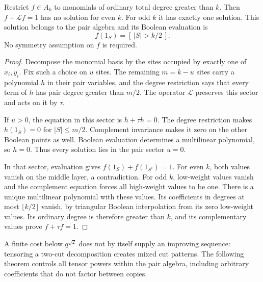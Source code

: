 \begin{proposition}
\label{prop:high-degree-multiplication}
Restrict \(f\in A_k\) to monomials of ordinary total degree greater
than \(k\). Then \(f+\mathcal Lf=1\) has no solution for even \(k\).
For odd \(k\) it has exactly one solution. This solution belongs to
the pair algebra and its Boolean evaluation is
\[
 f(1_S)=[\,|S|>k/2\,].
\]
No symmetry assumption on \(f\) is required.
\end{proposition}
\begin{proof}
Decompose the monomial basis by the sites occupied by exactly one
of \(x_i,y_i\). Fix such a choice on \(u\) sites. The remaining
\(m=k-u\) sites carry a polynomial \(h\) in their pair variables,
and the degree restriction says that every term of \(h\) has pair
degree greater than \(m/2\). The operator \(\mathcal L\) preserves
this sector and acts on it by \(\tau\).

If \(u>0\), the equation in this sector is \(h+\tau h=0\).
The degree restriction makes \(h(1_S)=0\) for \(|S|\leq m/2\).
Complement invariance makes it zero on the other Boolean points
as well. Boolean evaluation determines a multilinear polynomial,
so \(h=0\). Thus every solution lies in the pair sector \(u=0\).

In that sector, evaluation gives
\(f(1_S)+f(1_{S^{\mathrm c}})=1\).
For even \(k\), both values vanish on the middle layer, a
contradiction. For odd \(k\), low-weight values vanish and the
complement equation forces all high-weight values to be one.
There is a unique multilinear polynomial with these values.
Its coefficients in degrees at most \(\lfloor k/2\rfloor\) vanish,
by triangular Boolean interpolation from its zero low-weight
values. Its ordinary degree is therefore greater than \(k\),
and its complementary values prove \(f+\tau f=1\).
\end{proof}

A finite cost below \(q^{\sqrt2}\) does not by itself supply an improving
sequence: tensoring a two-cut decomposition creates mixed cut patterns.
The following theorem controls all tensor powers within the pair
algebra, including arbitrary coefficients that do not factor between
copies.

